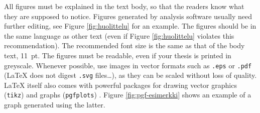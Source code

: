 All figures must be explained in the text body, so that the readers know what they are supposed to notice. Figures generated by analysis software usually need further editing, see Figure \ref{fig:huolittelu} for an example. The figures should be in the same language as other text (even if Figure \ref{fig:huolittelu} violates this recommendation). The recommended font size is the same as that of the body text, \SI{11}{pt}. The figures must be readable, even if your thesis is printed in greyscale. Whenever possible, use images in vector formats such as \texttt{.eps} or \texttt{.pdf} (\LaTeX{} does not digest \texttt{.svg} files\ldots), as they can be scaled without loss of quality. \LaTeX{} itself also comes with powerful packages for drawing vector graphics (\texttt{tikz})  and graphs (\texttt{pgfplots}) . Figure \ref{fig:pgf-esimerkki} shows an example of a graph generated using the latter.

